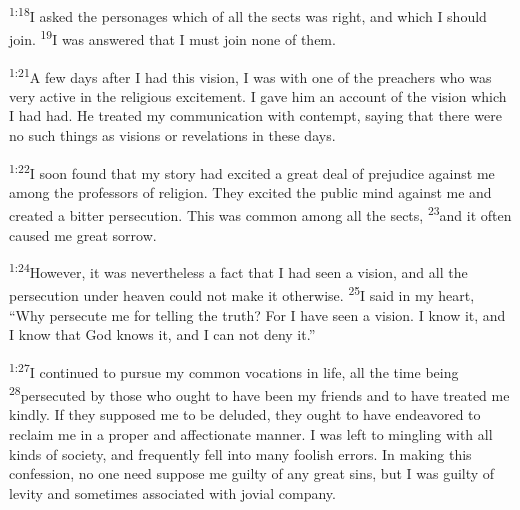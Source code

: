 \documentclass[openany,12pt,english]{book}
\newenvironment{para}{\par\pretolerance=100\tolerance=200\setlength{\emergencystretch}{0.6em}\relax}{\par}
\begin{document}
\begin{para}
    \textsuperscript{1:18}\thinspace{}I asked the personages which of all the sects was right, and which I should join.
    \textsuperscript{19}\thinspace{}I was answered that I must join none of them.
\end{para}

\bigskip{}

\begin{para}
    \textsuperscript{1:21}\thinspace{}A few days af\-ter I had this vi\-sion, I was with one of the preachers who was ver\-y ac\-tive in the re\-li\-gious ex\-cite\-ment. I gave him an ac\-count of the vi\-sion which I had had. He treated my com\-mu\-ni\-ca\-tion with con\-tempt, say\-ing that there were no such things as visions or revelations in these days.
\end{para}

\begin{para}
    \textsuperscript{1:22}\thinspace{}I soon found that my sto\-ry had ex\-cit\-ed a great deal of prej\-u\-dice a\-gainst me a\-mong the professors of re\-li\-gion. They ex\-cit\-ed the pub\-lic mind a\-gainst me and cre\-at\-ed a bit\-ter per\-se\-cu\-tion. This was com\-mon a\-mong all the sects,
    \textsuperscript{23}\thinspace{}and it of\-ten caused me great sor\-row.
\end{para}

\begin{para}
    \textsuperscript{1:24}\thinspace{}How\-ev\-er, it was nev\-er\-the\-less a fact that I had seen a vi\-sion, and all the per\-se\-cu\-tion un\-der heav\-en could not make it oth\-er\-wise.
    \textsuperscript{25}\thinspace{}I said in my heart, “Why per\-se\-cute me for tell\-ing the truth? For I have seen a vi\-sion. I know it, and I know that God knows it, and I can not de\-ny it.”
\end{para}

\bigskip{}

\begin{para}
    \textsuperscript{1:27}\thinspace{}I con\-tin\-ued to pur\-sue my com\-mon vocations in life, all the time be\-ing
    \textsuperscript{28}\thinspace{}per\-se\-cut\-ed by those who ought to have been my friends and to have treated me kind\-ly. If they sup\-posed me to be de\-lud\-ed, they ought to have endeavored to re\-claim me in a prop\-er and af\-fec\-tion\-ate man\-ner. I was left to mingling with all kinds of so\-ci\-e\-ty, and fre\-quent\-ly fell in\-to man\-y fool\-ish errors. In mak\-ing this con\-fes\-sion, no one need sup\-pose me guilt\-y of any great sins, but I was guilt\-y of lev\-i\-ty and some\-times as\-so\-ci\-at\-ed with jo\-vi\-al com\-pa\-ny.
\end{para}
\end{document}
